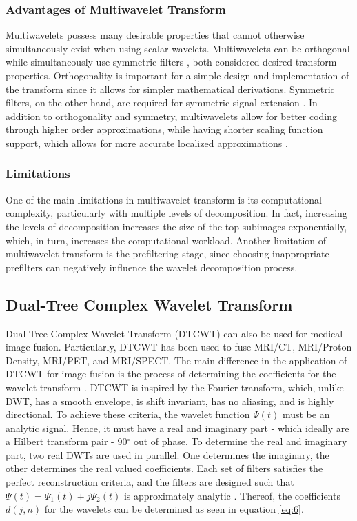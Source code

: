\documentclass{article}
\begin{document}
\subsubsection{Advantages of Multiwavelet Transform}
Multiwavelets possess many desirable properties that cannot otherwise simultaneously exist when using scalar wavelets. Multiwavelets can be orthogonal while simultaneously use symmetric filters \cite{Wang2004, Liu2010, Peng2015}, both considered desired transform properties. Orthogonality is important for a simple design and implementation of the transform since it allows for simpler mathematical derivations. Symmetric filters, on the other hand, are required for symmetric signal extension \cite{Wang2004}. In addition to orthogonality and symmetry, multiwavelets allow for better coding through higher order approximations, while having shorter scaling function support, which allows for more accurate localized approximations \cite{Wang2004, Liu2010}.

\subsubsection{Limitations}
One of the main limitations in multiwavelet transform is its computational complexity, particularly with multiple levels of decomposition. In fact, increasing the levels of decomposition increases the size of the top subimages exponentially, which, in turn, increases the computational workload. Another limitation of multiwavelet transform is the prefiltering stage, since choosing inappropriate prefilters can negatively influence the wavelet decomposition process.

\subsection{Dual-Tree Complex Wavelet Transform}
Dual-Tree Complex Wavelet Transform (DTCWT) can also be used for medical image fusion. Particularly, DTCWT has been used to fuse MRI/CT, MRI/Proton Density, MRI/PET, and MRI/SPECT. The main difference in the application of DTCWT for image fusion is the process of determining the coefficients for the wavelet transform \cite{K.Padmavathi.2016, Talbi.2018}. DTCWT is inspired by the Fourier transform, which, unlike DWT, has a smooth envelope, is shift invariant, has no aliasing, and is highly directional. To achieve these criteria, the wavelet function $\Psi(t)$ must be an analytic signal. Hence, it must have a real and imaginary part - which ideally are a Hilbert transform pair - 90$^{\circ}$ out of phase. To determine the real and imaginary part, two real DWTs are used in parallel. One determines the imaginary, the other determines the real valued coefficients. Each set of filters satisfies the perfect reconstruction criteria, and the filters are designed such that $\Psi(t) = \Psi_1(t)+j\Psi_2(t)$ is approximately analytic \cite{IvanW.Selesnick.2005}. Thereof, the coefficients $d(j,n)$ for the wavelets can be determined as seen in equation \ref{eq:6}.
\end{document}
